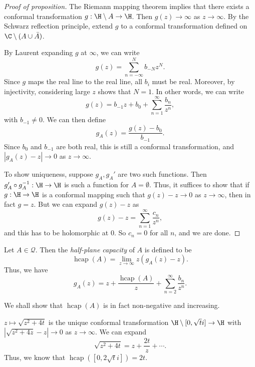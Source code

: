 \documentclass[a4paper]{article}
\DeclareMathOperator\hcap{hcap}
\begin{document}
\begin{proof}[Proof of proposition]
  The Riemann mapping theorem implies that there exists a conformal transformation $g: \H \setminus A \to \H$. Then $g(z) \to \infty$ as $z \to \infty$. By the Schwarz reflection principle, extend $g$ to a conformal transformation defined on $\C \setminus (A \cup \bar{A})$.

  By Laurent expanding $g$ at $\infty$, we can write
  \[
    g(z) = \sum_{n = -\infty}^N b_{-N} z^N.
  \]
  Since $g$ maps the real line to the real line, all $b_i$ must be real. Moreover, by injectivity, considering large $z$ shows that $N = 1$. In other words, we can write
  \[
    g(z) = b_{-1} z + b_0 + \sum_{n = 1}^\infty \frac{b_n}{z^n},
  \]
  with $b_{-1} \not= 0$. We can then define
  \[
    g_A(z) = \frac{g(z) - b_0}{b_{-1}}.
  \]
  Since $b_0$ and $b_{-1}$ are both real, this is still a conformal transformation, and $|g_A(z) - z| \to 0$ as $z \to \infty$.

  To show uniqueness, suppose $g_A, g_A'$ are two such functions. Then $g_A' \circ g_A^{-1}: \H \to \H$ is such a function for $A = \emptyset$. Thus, it suffices to show that if $g: \H \to \H$ is a conformal mapping such that $g(z) - z \to 0$ as $z \to \infty$, then in fact $g = z$. But we can expand $g(z) - z$ as
  \[
    g(z) - z = \sum_{n = 1}^\infty \frac{c_n}{z^n},
  \]
  and this has to be holomorphic at $0$. So $c_n = 0$ for all $n$, and we are done.
\end{proof}

\begin{defi}
  Let $A \in \mathcal{Q}$. Then the \emph{half-plane capacity} of $A$ is defined to be
  \[
    \hcap(A) = \lim_{z \to \infty} z(g_A(z) - z).
  \]
  Thus, we have
  \[
    g_A(z) = z + \frac{\hcap(A)}{z} + \sum_{n = 2}^\infty \frac{b_n}{z^n}.
  \]
\end{defi}
We shall show that $\hcap(A)$ is in fact non-negative and increasing.

\begin{eg}
  $z \mapsto \sqrt{z^2 + 4t}$ is the unique conformal transformation $\H \setminus [0, \sqrt{t}i] \to \H$ with $|\sqrt{z^2 + 4z} - z| \to 0$ as $z \to \infty$. We can expand
  \[
    \sqrt{z^2 + 4t} = z + \frac{2t}{z} + \cdots.
  \]
  Thus, we know that $\hcap([0, 2\sqrt{t} i]) = 2t$.
\end{eg}
\end{document}
